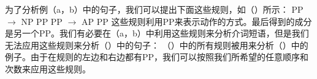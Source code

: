 为了分析例（a，b）中的句子，我们可以提出下面这些规则，如（）所示：
\eal
\ex PP $\to$ NP PP
\ex PP $\to$ AP PP
\zl
这些规则利用PP来表示动作的方式。最后得到的成分是另一个PP。我们有必要在（a，b）中利用这些规则来分析介词短语，但是我们无法应用这些规则来分析（）中的句子：
\eal
{}
\zl
（）中的所有规则被用来分析（）中的例子。由于在规则的左边和右边都有PP，我们可以按照我们所希望的任意顺序和次数来应用这些规则。


